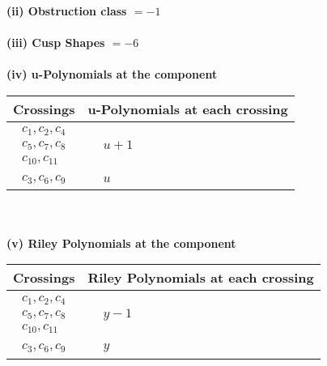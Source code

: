 \documentclass[1p]{elsarticle_modified}
\theoremstyle{definition}
\begin{document}
\flushleft \textbf{(ii) Obstruction class $= -1$}\\~\\
\flushleft \textbf{(iii) Cusp Shapes $= -6$}\\~\\
\newpage\renewcommand{\arraystretch}{1}
\flushleft \textbf{(iv) u-Polynomials at the component}\newline \\
\begin{tabular}{m{50pt}|m{274pt}}
Crossings & \hspace{64pt}u-Polynomials at each crossing \\
\hline $$\begin{aligned}c_{1},c_{2},c_{4}\\c_{5},c_{7},c_{8}\\c_{10},c_{11}\end{aligned}$$&$\begin{aligned}
&u+1
\end{aligned}$\\
\hline $$\begin{aligned}c_{3},c_{6},c_{9}\end{aligned}$$&$\begin{aligned}
&u
\end{aligned}$\\
\hline
\end{tabular}\\~\\
\newpage\renewcommand{\arraystretch}{1}
\flushleft \textbf{(v) Riley Polynomials at the component}\newline \\
\begin{tabular}{m{50pt}|m{274pt}}
Crossings & \hspace{64pt}Riley Polynomials at each crossing \\
\hline $$\begin{aligned}c_{1},c_{2},c_{4}\\c_{5},c_{7},c_{8}\\c_{10},c_{11}\end{aligned}$$&$\begin{aligned}
&y-1
\end{aligned}$\\
\hline $$\begin{aligned}c_{3},c_{6},c_{9}\end{aligned}$$&$\begin{aligned}
&y
\end{aligned}$\\
\hline
\end{tabular}\\~\\
\end{document}

